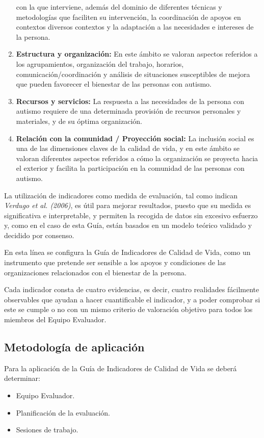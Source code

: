 \begin{enumerate}
	con la que interviene, además del dominio de diferentes técnicas y
	metodologías que faciliten su intervención, la coordinación de apoyos en
	contextos diversos contextos y la adaptación a las necesidades e intereses
	de la persona.  
	\item \textbf{Estructura y organización: }En este ámbito se valoran aspectos
	referidos a los agrupamientos, organización del trabajo, horarios,
	comunicación/coordinación y análisis de situaciones susceptibles de mejora
	que pueden favorecer el bienestar de las personas con autismo.
	\item \textbf{Recursos y servicios: }La respuesta a las necesidades de la
	persona con autismo requiere de una determinada provisión de recursos
	personales y materiales, y de su óptima organización. 
	\item \textbf{Relación con la comunidad / Proyección social: }La inclusión
	social es una de las dimensiones claves de la calidad de vida, y en este
	ámbito se valoran diferentes aspectos referidos a cómo la organización se
	proyecta hacia el exterior y facilita la participación en la comunidad de
	las personas con autismo.  
\end{enumerate}
La utilización de indicadores como medida de evaluación, tal como indican
\textit{Verdugo et al. (2006)}, es útil para mejorar resultados, puesto que su medida es
significativa e interpretable, y permiten la recogida de datos sin excesivo
esfuerzo y, como en el caso de esta Guía, están basados en un modelo teórico
validado y decidido por consenso. 
 
En esta línea se configura la Guía de Indicadores de Calidad de Vida, como un
instrumento que pretende ser sensible a los apoyos y condiciones de las
organizaciones relacionados con el bienestar de la persona.
 
Cada indicador consta de cuatro evidencias, es decir, cuatro realidades
fácilmente observables que ayudan a hacer cuantificable el indicador, y a poder
comprobar si este se cumple o no con un mismo criterio de valoración objetivo
para todos los miembros del Equipo Evaluador. 

\subsection{Metodología de aplicación}
Para la aplicación de la Guía de Indicadores de Calidad de Vida se deberá determinar:
\begin{itemize}
	\item Equipo Evaluador. 
	\item Planificación de la evaluación. 
	\item Sesiones de trabajo. 
\end{itemize}
